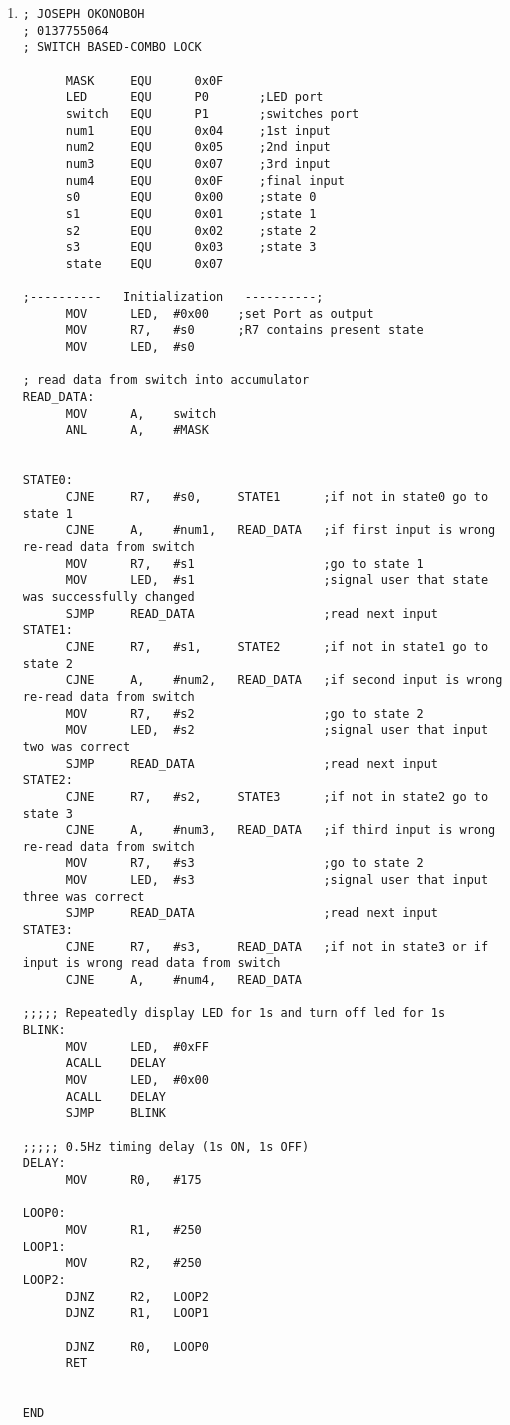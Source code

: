 \documentclass[9pt]{article}
\begin{document}
\begin{enumerate}
   \item \begin{verbatim}; JOSEPH OKONOBOH
; 0137755064
; SWITCH BASED-COMBO LOCK
      
      MASK     EQU      0x0F
      LED      EQU      P0       ;LED port
      switch   EQU      P1       ;switches port
      num1     EQU      0x04     ;1st input
      num2     EQU      0x05     ;2nd input
      num3     EQU      0x07     ;3rd input
      num4     EQU      0x0F     ;final input
      s0       EQU      0x00     ;state 0
      s1       EQU      0x01     ;state 1
      s2       EQU      0x02     ;state 2
      s3       EQU      0x03     ;state 3
      state    EQU      0x07

;----------   Initialization   ----------;
      MOV      LED,  #0x00    ;set Port as output
      MOV      R7,   #s0      ;R7 contains present state
      MOV      LED,  #s0

; read data from switch into accumulator
READ_DATA:
      MOV      A,    switch
      ANL      A,    #MASK
      

STATE0:
      CJNE     R7,   #s0,     STATE1      ;if not in state0 go to state 1
      CJNE     A,    #num1,   READ_DATA   ;if first input is wrong re-read data from switch
      MOV      R7,   #s1                  ;go to state 1
      MOV      LED,  #s1                  ;signal user that state was successfully changed
      SJMP     READ_DATA                  ;read next input
STATE1:
      CJNE     R7,   #s1,     STATE2      ;if not in state1 go to state 2
      CJNE     A,    #num2,   READ_DATA   ;if second input is wrong re-read data from switch
      MOV      R7,   #s2                  ;go to state 2
      MOV      LED,  #s2                  ;signal user that input two was correct
      SJMP     READ_DATA                  ;read next input
STATE2:
      CJNE     R7,   #s2,     STATE3      ;if not in state2 go to state 3
      CJNE     A,    #num3,   READ_DATA   ;if third input is wrong re-read data from switch
      MOV      R7,   #s3                  ;go to state 2
      MOV      LED,  #s3                  ;signal user that input three was correct
      SJMP     READ_DATA                  ;read next input
STATE3:
      CJNE     R7,   #s3,     READ_DATA   ;if not in state3 or if input is wrong read data from switch
      CJNE     A,    #num4,   READ_DATA

;;;;; Repeatedly display LED for 1s and turn off led for 1s
BLINK:
      MOV      LED,  #0xFF      
      ACALL    DELAY
      MOV      LED,  #0x00      
      ACALL    DELAY
      SJMP     BLINK

;;;;; 0.5Hz timing delay (1s ON, 1s OFF)
DELAY:
      MOV      R0,   #175
      
LOOP0:
      MOV      R1,   #250		
LOOP1:
      MOV      R2,   #250
LOOP2:	
      DJNZ     R2,   LOOP2      
      DJNZ     R1,   LOOP1

      DJNZ     R0,   LOOP0
      RET


END
         \end{verbatim}
\end{enumerate}
\end{document}
